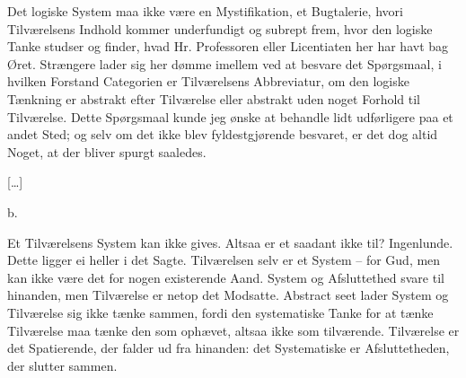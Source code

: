 \documentclass[12pt,a4paper]{article}
\begin{document}
Det logiske System maa ikke være en Mystifikation, et Bugtalerie, hvori Tilværelsens Indhold kommer underfundigt og subrept frem, hvor den logiske Tanke studser og finder, hvad Hr. Professoren eller Licentiaten her har havt bag Øret. Strængere lader sig her dømme imellem ved at besvare det Spørgsmaal, i hvilken Forstand Categorien er Tilværelsens Abbreviatur, om den logiske Tænkning er abstrakt efter Tilværelse eller abstrakt uden noget Forhold til Tilværelse. Dette Spørgsmaal kunde jeg ønske at behandle lidt udførligere paa et andet Sted; og selv om det ikke blev fyldestgjørende besvaret, er det dog altid Noget, at der bliver spurgt saaledes.

[…]

b.

Et Tilværelsens System kan ikke gives. Altsaa er et saadant ikke til? Ingenlunde. Dette ligger ei heller i det Sagte. Tilværelsen selv er et System – for Gud, men kan ikke være det for nogen existerende Aand. System og Afsluttethed svare til hinanden, men Tilværelse er netop det Modsatte. Abstract seet lader System og Tilværelse sig ikke tænke sammen, fordi den systematiske Tanke for at tænke Tilværelse maa tænke den som ophævet, altsaa ikke som tilværende. Tilværelse er det Spatierende, der falder ud fra hinanden: det Systematiske er Afsluttetheden, der slutter sammen.
\end{document}
